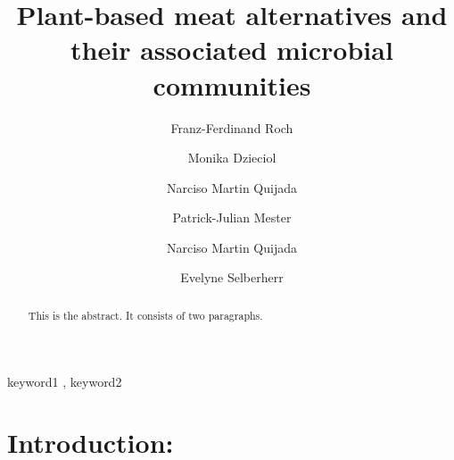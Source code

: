 \documentclass[preprint, 3p,
authoryear]{elsarticle} %
\begin{document}
\begin{frontmatter}

  \title{Plant-based meat alternatives and their associated microbial
communities}
    \author[LMM]{Franz-Ferdinand Roch%
  }
  
    \author[LMM]{Monika Dzieciol%
  }
  
    \author[LMM]{Narciso Martin Quijada%
  }
  
    \author[LMM]{Patrick-Julian Mester%
  }
  
    \author[LMM]{Narciso Martin Quijada%
  }
  
    \author[LMM]{Evelyne Selberherr%
  }
  
  \begin{abstract}
  This is the abstract. It consists of two paragraphs.
  \end{abstract}
    \begin{keyword}
    keyword1 \sep 
    keyword2
  \end{keyword}
  
 \end{frontmatter}

\hypertarget{introduction}{%
\section{Introduction:}\label{introduction}}
\end{document}

